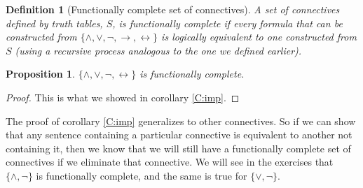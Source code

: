 \documentclass{article}
\theoremstyle{plain}
\newtheorem{proposition}[theorem]{Proposition}{\bfseries}{\itshape}
\newtheorem{definition}[theorem]{Definition}{\bfseries}{\upshape}
\begin{document}
\begin{definition}[Functionally complete set of connectives]
A set of connectives defined by truth tables, $S$, is \emph{functionally complete} if every formula that can be constructed from $\{\wedge,\vee,\neg,\rightarrow,\leftrightarrow\}$ is logically equivalent to one constructed from $S$ (using a recursive process analogous to the one we defined earlier). 
\end{definition}

\begin{proposition}\label{P:imp}
$\{\wedge,\vee,\neg,\leftrightarrow\}$ is functionally complete.
\end{proposition}
\begin{proof}
This is what we showed in corollary \ref{C:imp}.
\end{proof}

The proof of corollary \ref{C:imp} generalizes to other connectives. So if we can show that any sentence containing a particular connective is equivalent to another not containing it, then we know that we will still have a functionally complete set of connectives if we eliminate that connective. We will see in the exercises that $\{\wedge, \neg\}$ is functionally complete, and the same is true for $\{\vee,\neg\}$. 
\end{document}
